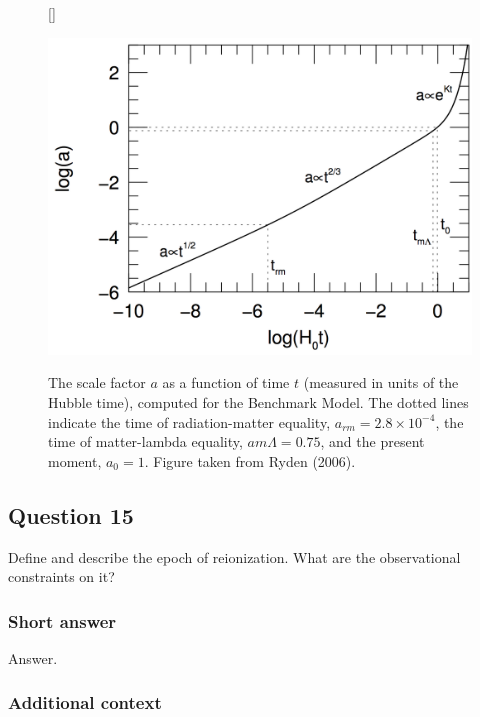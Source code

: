 \documentclass[a4paper,11pt]{article}
\begin{document}
\begin{figure}[t]
    [\FBwidth]
    {\caption{\footnotesize{The scale factor $a$ as a function of time $t$ (measured in units of the Hubble time), computed for the Benchmark Model. The dotted lines indicate the time of radiation-matter equality, $a_{rm}=2.8\times10^{-4}$, the time of matter-lambda equality, $a{m\Lambda}=0.75$, and the present moment, $a_0=1$. Figure taken from Ryden (2006).}}
    \label{fig:avst}}
    {\includegraphics[width=12cm]{figures/avst.png}}
\end{figure}

%
%

\newpage
\subsection{Question 15}

Define and describe the epoch of reionization. What are the observational constraints on it?

\subsubsection{Short answer}

Answer.

\subsubsection{Additional context}
\end{document}
